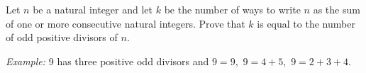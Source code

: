Let $n$ be a natural integer and let $k$ be the number of ways to write $n$ as
the sum of one or more consecutive natural integers.
Prove that $k$ is equal to the number of odd positive divisors of $n$.

\textit{Example:} 9 has three positive odd divisors and $9=9$,\, $9=4+5$,\, $9=2+3+4$.
